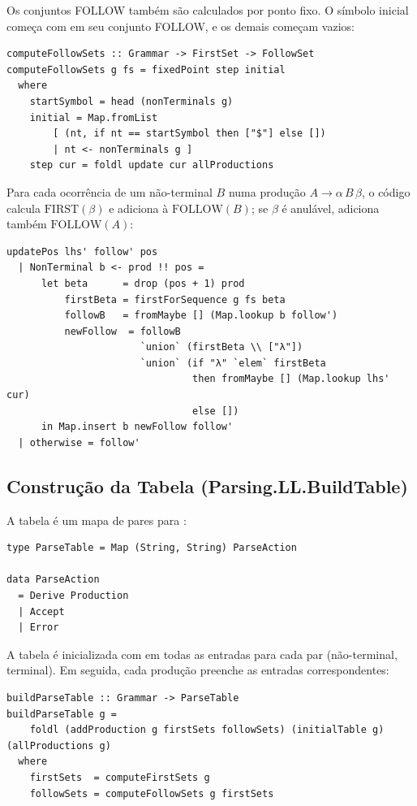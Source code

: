 Os conjuntos FOLLOW também são calculados por ponto fixo. O símbolo
inicial começa com  em seu conjunto
FOLLOW, e os demais começam vazios:

\begin{verbatim}
computeFollowSets :: Grammar -> FirstSet -> FollowSet
computeFollowSets g fs = fixedPoint step initial
  where
    startSymbol = head (nonTerminals g)
    initial = Map.fromList
        [ (nt, if nt == startSymbol then ["$"] else [])
        | nt <- nonTerminals g ]
    step cur = foldl update cur allProductions
\end{verbatim}

Para cada ocorrência de um não-terminal \(B\) numa produção \(A \to
\alpha\,B\,\beta\), o código calcula \(\mathrm{FIRST}(\beta)\) e
adiciona à \(\mathrm{FOLLOW}(B)\); se \(\beta\) é anulável, adiciona
também \(\mathrm{FOLLOW}(A)\):

\begin{verbatim}
updatePos lhs' follow' pos
  | NonTerminal b <- prod !! pos =
      let beta      = drop (pos + 1) prod
          firstBeta = firstForSequence g fs beta
          followB   = fromMaybe [] (Map.lookup b follow')
          newFollow  = followB
                       `union` (firstBeta \\ ["λ"])
                       `union` (if "λ" `elem` firstBeta
                                then fromMaybe [] (Map.lookup lhs' cur)
                                else [])
      in Map.insert b newFollow follow'
  | otherwise = follow'
\end{verbatim}

\subsection{Construção da Tabela (Parsing.LL.BuildTable)}

A tabela é um mapa de pares  para
:

\begin{verbatim}
type ParseTable = Map (String, String) ParseAction

data ParseAction
  = Derive Production
  | Accept
  | Error
\end{verbatim}

A tabela é inicializada com  em todas
as entradas  para cada par
(não-terminal, terminal). Em seguida, cada produção preenche as
entradas correspondentes:

\begin{verbatim}
buildParseTable :: Grammar -> ParseTable
buildParseTable g =
    foldl (addProduction g firstSets followSets) (initialTable g) (allProductions g)
  where
    firstSets  = computeFirstSets g
    followSets = computeFollowSets g firstSets
\end{verbatim}

